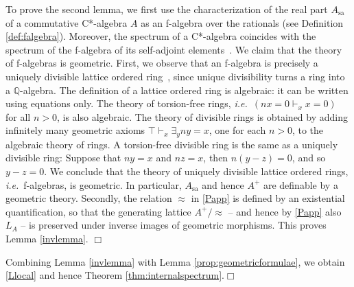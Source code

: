 \documentclass[11pt]{article}
\newcommand{\Q}{\mathbb{Q}}
\newcommand{\er}{\eqref}
\newcommand{\sa}{\ensuremath{_{\mathrm{sa}}}}
\newcommand{\ie}{\textit{i.e.}}
\newcommand{\qed}{\nobreak\hfill$\Box$}
\begin{document}
 To prove the second lemma, we first use the  characterization of
the real part $A\sa$ of a commutative C*-algebra $A$ as an f-algebra over the rationals
(see Definition \ref{def:falgebra}). Moreover, the spectrum of a C*-algebra coincides with the spectrum of the f-algebra of
its self-adjoint elements~\cite{CoquandSpitters:cstar}.
We claim that the theory of
f-algebras is geometric. First, we observe that an f-algebra is precisely a
uniquely
divisible lattice ordered ring~\cite[p151]{coquand05},
since unique divisibility turns a ring into a $\Q$-algebra. The definition of
a lattice ordered ring is algebraic: it can be written using equations only.
The theory of torsion-free rings,
\ie\  $(nx=0\vdash_x x=0)$ for all $n>0$, is also algebraic.
The theory of divisible rings is obtained by adding infinitely many
geometric axioms $\top \vdash_x \exists_{y} n y=x$, one
for each $n>0$, to the algebraic theory of rings. A torsion-free divisible ring
is the same as a uniquely divisible ring: 
Suppose that $ny=x$ and $nz=x$, then $n(y-z)=0$, and so
$y-z=0$. We conclude that the theory of uniquely divisible lattice
ordered rings, \ie\ f-algebras, is geometric. In particular, $A\sa$ and hence $A^+$ are 
definable by a geometric theory. Secondly, the  relation $\approx$ in \er{Papp} is defined by an existential quantification, so that 
the generating lattice $A^+/\approx$ -- and hence by \er{Papp} also $L_A$ --
 is
preserved under inverse images of geometric morphisms.  This proves Lemma \ref{invlemma}.
\qed

Combining Lemma \ref{invlemma} with  Lemma \ref{prop:geometricformulae}, 
we obtain \er{Llocal} and hence Theorem \ref{thm:internalspectrum}.\qed

\medskip
\end{document}
